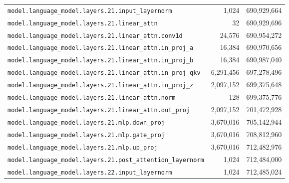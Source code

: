 \documentclass[10pt,a4paper]{article}
\theoremstyle{definition}
\begin{document}
\begin{appendices}
\begin{longtable}{p{9.5cm}rr}
\texttt{model.\allowbreak{}language\_model.\allowbreak{}layers.\allowbreak{}21.\allowbreak{}input\_layernorm} & 1,024 & 690,929,664 \\
\texttt{model.\allowbreak{}language\_model.\allowbreak{}layers.\allowbreak{}21.\allowbreak{}linear\_attn} & 32 & 690,929,696 \\
\texttt{model.\allowbreak{}language\_model.\allowbreak{}layers.\allowbreak{}21.\allowbreak{}linear\_attn.\allowbreak{}conv1d} & 24,576 & 690,954,272 \\
\texttt{model.\allowbreak{}language\_model.\allowbreak{}layers.\allowbreak{}21.\allowbreak{}linear\_attn.\allowbreak{}in\_proj\_a} & 16,384 & 690,970,656 \\
\texttt{model.\allowbreak{}language\_model.\allowbreak{}layers.\allowbreak{}21.\allowbreak{}linear\_attn.\allowbreak{}in\_proj\_b} & 16,384 & 690,987,040 \\
\texttt{model.\allowbreak{}language\_model.\allowbreak{}layers.\allowbreak{}21.\allowbreak{}linear\_attn.\allowbreak{}in\_proj\_qkv} & 6,291,456 & 697,278,496 \\
\texttt{model.\allowbreak{}language\_model.\allowbreak{}layers.\allowbreak{}21.\allowbreak{}linear\_attn.\allowbreak{}in\_proj\_z} & 2,097,152 & 699,375,648 \\
\texttt{model.\allowbreak{}language\_model.\allowbreak{}layers.\allowbreak{}21.\allowbreak{}linear\_attn.\allowbreak{}norm} & 128 & 699,375,776 \\
\texttt{model.\allowbreak{}language\_model.\allowbreak{}layers.\allowbreak{}21.\allowbreak{}linear\_attn.\allowbreak{}out\_proj} & 2,097,152 & 701,472,928 \\
\texttt{model.\allowbreak{}language\_model.\allowbreak{}layers.\allowbreak{}21.\allowbreak{}mlp.\allowbreak{}down\_proj} & 3,670,016 & 705,142,944 \\
\texttt{model.\allowbreak{}language\_model.\allowbreak{}layers.\allowbreak{}21.\allowbreak{}mlp.\allowbreak{}gate\_proj} & 3,670,016 & 708,812,960 \\
\texttt{model.\allowbreak{}language\_model.\allowbreak{}layers.\allowbreak{}21.\allowbreak{}mlp.\allowbreak{}up\_proj} & 3,670,016 & 712,482,976 \\
\texttt{model.\allowbreak{}language\_model.\allowbreak{}layers.\allowbreak{}21.\allowbreak{}post\_attention\_layernorm} & 1,024 & 712,484,000 \\
\texttt{model.\allowbreak{}language\_model.\allowbreak{}layers.\allowbreak{}22.\allowbreak{}input\_layernorm} & 1,024 & 712,485,024 \\

\end{longtable}
\end{appendices}
\end{document}
